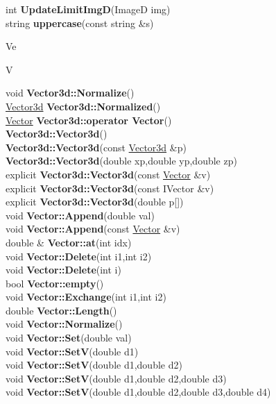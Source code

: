 \documentclass[10pt,titlepage]{article}
\def\functionlistentry#1#2#3#4#5#6{\noindent #1 {\bf #2}(#3) \dotfill #6\\}
\def\letterref#1{}
\def\letterlabel#1{\vspace{0.5cm}\centerline{\Large #1}}
\def\letterlabelend#1{}
\begin{document}
{{\letterref{Up}
\letterlabelend{Up}
\functionlistentry{int}{UpdateLimitImgD}{ImageD img}{84}{Images}{}
\functionlistentry{string}{uppercase}{const string \&s}{1412}{genericTools}{}

\letterlabel{Ve}
\letterlabel{V}
\letterref{A}
\letterref{B}
\letterref{C}
\letterref{D}
\letterref{E}
\letterref{F}
\letterref{G}
\letterref{H}
\letterref{I}
\letterref{K}
\letterref{L}
\letterref{M}
\letterref{N}
\letterref{O}
\letterref{P}
\letterref{Q}
\letterref{R}
\letterref{S}
\letterref{T}
\letterref{U}
\letterref{V}
\letterref{W}
\letterref{X}
\letterref{Y}
\letterref{Z}

\letterref{Ve}
\letterref{Vi}
\letterlabelend{Ve}
\functionlistentry{void}{Vector3d::Normalize}{}{203}{datastructures}{}
\functionlistentry{\hyperlink{Vector3d}{Vector3d}}{Vector3d::Normalized}{}{202}{datastructures}{}
\functionlistentry{\hyperlink{Vector}{Vector}}{Vector3d::operator Vector}{}{201}{datastructures}{}
\functionlistentry{}{Vector3d::Vector3d}{}{195}{datastructures}{}
\functionlistentry{}{Vector3d::Vector3d}{const \hyperlink{Vector3d}{Vector3d} \&p}{196}{datastructures}{}
\functionlistentry{}{Vector3d::Vector3d}{double xp,double yp,double zp}{197}{datastructures}{}
\functionlistentry{explicit}{Vector3d::Vector3d}{const \hyperlink{Vector}{Vector} \&v}{198}{datastructures}{}
\functionlistentry{explicit}{Vector3d::Vector3d}{const IVector \&v}{199}{datastructures}{}
\functionlistentry{explicit}{Vector3d::Vector3d}{double p[]}{200}{datastructures}{}
\functionlistentry{void}{Vector::Append}{double val}{245}{datastructures}{}
\functionlistentry{void}{Vector::Append}{const \hyperlink{Vector}{Vector} \&v}{246}{datastructures}{}
\functionlistentry{double \&}{Vector::at}{int idx}{233}{datastructures}{}
\functionlistentry{void}{Vector::Delete}{int i1,int i2}{248}{datastructures}{}
\functionlistentry{void}{Vector::Delete}{int i}{249}{datastructures}{}
\functionlistentry{bool}{Vector::empty}{}{236}{datastructures}{}
\functionlistentry{void}{Vector::Exchange}{int i1,int i2}{247}{datastructures}{}
\functionlistentry{double}{Vector::Length}{}{250}{datastructures}{}
\functionlistentry{void}{Vector::Normalize}{}{251}{datastructures}{}
\functionlistentry{void}{Vector::Set}{double val}{239}{datastructures}{}
\functionlistentry{void}{Vector::SetV}{double d1}{240}{datastructures}{}
\functionlistentry{void}{Vector::SetV}{double d1,double d2}{241}{datastructures}{}
\functionlistentry{void}{Vector::SetV}{double d1,double d2,double d3}{242}{datastructures}{}
\functionlistentry{void}{Vector::SetV}{double d1,double d2,double d3,double d4}{243}{datastructures}{}
}}
\end{document}
